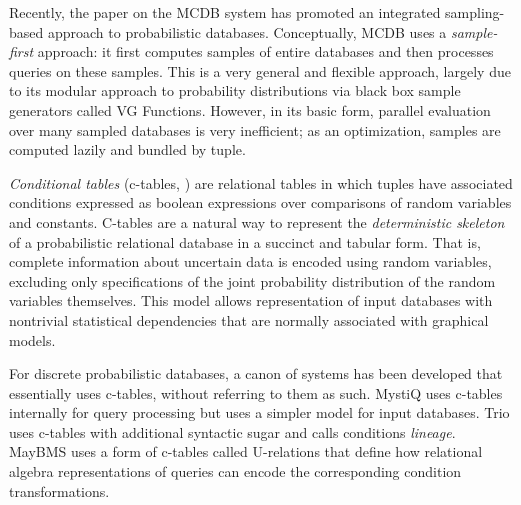 Recently,  the paper  \cite{MCDB} on  the MCDB  system  has promoted an integrated  sampling-based  approach to  probabilistic databases.  Conceptually,  MCDB uses a {\em sample-first}\/ approach: it   first  computes  samples  of  entire databases and then processes queries  on these samples.  This is a very general and flexible approach, largely due to its modular approach to probability distributions via black box sample generators called VG Functions.  However, in its basic form, parallel evaluation over many sampled databases is very inefficient; as an optimization, samples are computed lazily and bundled by tuple.  

{\em  Conditional tables}\/  (c-tables, \cite{IL1984})  are relational tables in which tuples have associated conditions expressed as boolean expressions over  comparisons of random variables  and constants. C-tables are a natural way to  represent  the  {\em  deterministic skeleton}\/  of a probabilistic relational  database in  a succinct  and tabular  form.  That  is, complete information  about uncertain data is encoded using random  variables, excluding only  specifications  of the  joint  probability  distribution of  the random  variables   themselves.   This  model   allows  representation of  input databases  with  nontrivial statistical  dependencies that are normally associated with graphical models. 

For discrete probabilistic  databases, a canon of systems has been developed that essentially uses  c-tables, without referring to them as such. MystiQ  \cite{dalvi07efficient}  uses  c-tables internally  for  query processing  but  uses  a  simpler  model for  input  databases.   Trio \cite{WidomTrio2008}  uses  c-tables with  additional  syntactic sugar  and calls conditions {\em lineage}\/.  MayBMS \cite{AJKO2008}  uses a  form of  c-tables called  U-relations that define how relational algebra representations of queries can encode the corresponding condition transformations.


